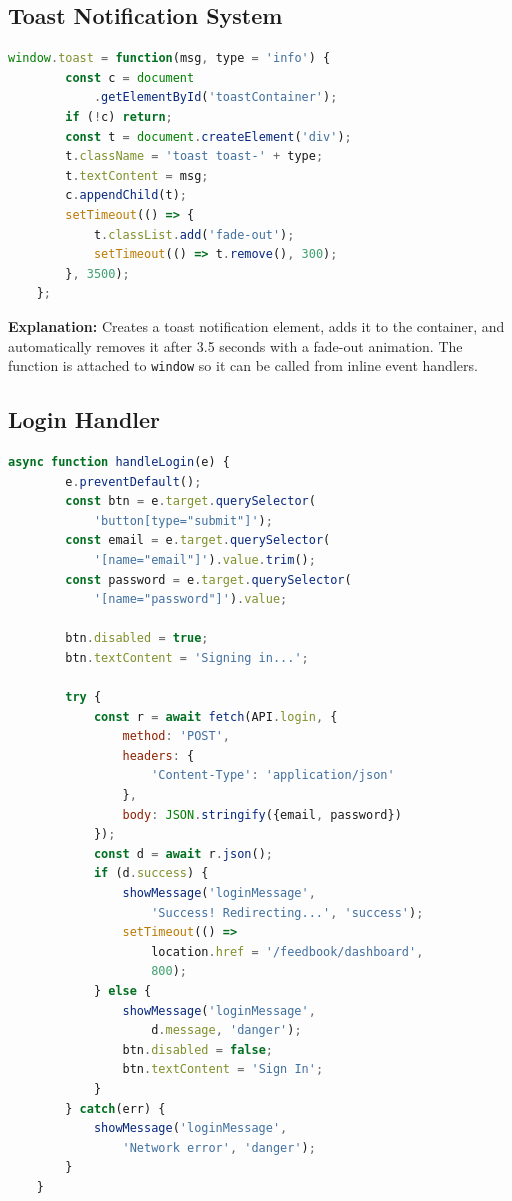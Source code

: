 \documentclass[12pt,a4paper]{report}
\begin{document}
\subsection{Toast Notification System}

\begin{lstlisting}[language=JavaScript]
    window.toast = function(msg, type = 'info') {
        const c = document
            .getElementById('toastContainer');
        if (!c) return;
        const t = document.createElement('div');
        t.className = 'toast toast-' + type;
        t.textContent = msg;
        c.appendChild(t);
        setTimeout(() => {
            t.classList.add('fade-out');
            setTimeout(() => t.remove(), 300);
        }, 3500);
    };
\end{lstlisting}

\textbf{Explanation:} Creates a toast notification element, adds it to the container, and automatically removes it after 3.5 seconds with a fade-out animation. The function is attached to \texttt{window} so it can be called from inline event handlers.

\subsection{Login Handler}

\begin{lstlisting}[language=JavaScript]
    async function handleLogin(e) {
        e.preventDefault();
        const btn = e.target.querySelector(
            'button[type="submit"]');
        const email = e.target.querySelector(
            '[name="email"]').value.trim();
        const password = e.target.querySelector(
            '[name="password"]').value;

        btn.disabled = true;
        btn.textContent = 'Signing in...';

        try {
            const r = await fetch(API.login, {
                method: 'POST',
                headers: {
                    'Content-Type': 'application/json'
                },
                body: JSON.stringify({email, password})
            });
            const d = await r.json();
            if (d.success) {
                showMessage('loginMessage',
                    'Success! Redirecting...', 'success');
                setTimeout(() =>
                    location.href = '/feedbook/dashboard',
                    800);
            } else {
                showMessage('loginMessage',
                    d.message, 'danger');
                btn.disabled = false;
                btn.textContent = 'Sign In';
            }
        } catch(err) {
            showMessage('loginMessage',
                'Network error', 'danger');
        }
    }
\end{lstlisting}
\end{document}
